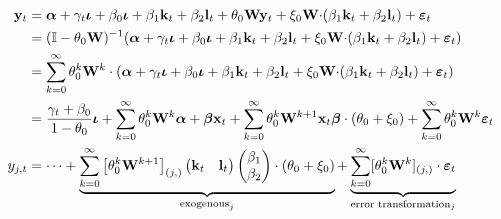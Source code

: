 \begin{align}
    \label{eq:static-vector-reduced}
    \mathbf y_t &= \boldsymbol \alpha
                    + \gamma_t \boldsymbol\iota
                    + \beta_0  \boldsymbol \iota
                    + \beta_1  \mathbf k_t + \beta_2 \mathbf l_t
                    + \theta_0 \mathbf W \mathbf y_t
                    + \xi_0 \mathbf W \mathbf \cdot (\beta_1\mathbf k_t + \beta_2\mathbf l_t)
                    + \boldsymbol \varepsilon_t
    \\ \notag
                &= (\mathbb I-\theta_0 \mathbf W)^{-1}(
                    \boldsymbol \alpha
                    + \gamma_t \boldsymbol\iota
                    + \beta_0  \boldsymbol \iota
                    + \beta_1 \mathbf k_t + \beta_2 \mathbf l_t
                    + \xi_0 \mathbf W \mathbf \cdot (\beta_1\mathbf k_t + \beta_2\mathbf l_t)
                    + \boldsymbol \varepsilon_t
                )
    \\
    \label{eq:static-reflection-problem}
                &= \sum_{k=0}^\infty \theta_0^k \mathbf W^k \cdot(
                    \boldsymbol \alpha
                    + \gamma_t \boldsymbol\iota
                    + \beta_0  \boldsymbol \iota
                    + \beta_1 \mathbf k_t + \beta_2 \mathbf l_t
                    + \xi_0 \mathbf W \mathbf \cdot (\beta_1\mathbf k_t + \beta_2\mathbf l_t)
                    + \boldsymbol \varepsilon_t
                )
    \\
    \label{eq:static-sub-reflection-exogenous}
                &= \frac{\gamma_t + \beta_0}{1-\theta_0}\boldsymbol \iota
                    + \sum_{k=0}^\infty \theta_0^k \mathbf W^k
                        \boldsymbol \alpha
                    + \boldsymbol\beta \mathbf x_t
                    + \sum_{k=0}^\infty \theta_0^k \mathbf W^{k+1} \mathbf x_t
                        \boldsymbol \beta \cdot (\theta_0 + \xi_0)
                    + \sum_{k=0}^\infty \theta_0^k \mathbf W^k
                        \boldsymbol \varepsilon_t
    \\
    \label{eq:static-red-endogenous-effect}
    y_{j,t}     &= \dots
                    + \underbrace{
                        \sum_{k=0}^\infty
                        \left[
                            \theta_0^k \mathbf W^{k+1}
                        \right]_{(j,)}
                        \begin{pmatrix}\mathbf k_t & \mathbf l_t\end{pmatrix}
                        \begin{pmatrix}\beta_1 \\ \beta_2\end{pmatrix}
                        \cdot (\theta_0 + \xi_0)
                    }_{\text{exogenous}_j}
                    + \underbrace{
                        \sum_{k=0}^\infty
                        [\theta_0^k \mathbf W^k]_{(j,)} \cdot
                    \boldsymbol \varepsilon_t
                    }_{\text{error transformation}_j}
\end{align}

